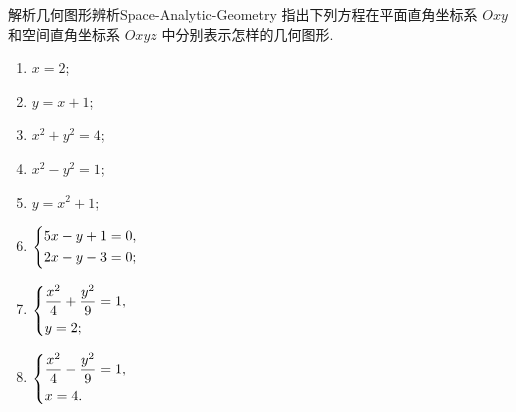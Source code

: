 \begin{problem}{解析几何图形辨析}{Space-Analytic-Geometry}
    指出下列方程在平面直角坐标系 $Oxy$ 和空间直角坐标系 $Oxyz$ 中分别表示怎样的几何图形.
    \begin{enumerate}
        \item $x = 2$;
        \item $y = x + 1$;
        \item $x^2 + y^2 = 4$;
        \item $x^2 - y^2 = 1$;
        \item $y = x^2 + 1$;
        \item $\begin{dcases} 5x - y + 1 = 0, \\ 2x - y - 3 = 0; \end{dcases}$
        \item $\begin{dcases} \dfrac{x^2}{4} + \dfrac{y^2}{9} = 1, \\ y = 2; \end{dcases}$
        \item $\begin{dcases} \dfrac{x^2}{4} - \dfrac{y^2}{9} = 1, \\ x = 4. \end{dcases}$
    \end{enumerate}
\end{problem}

